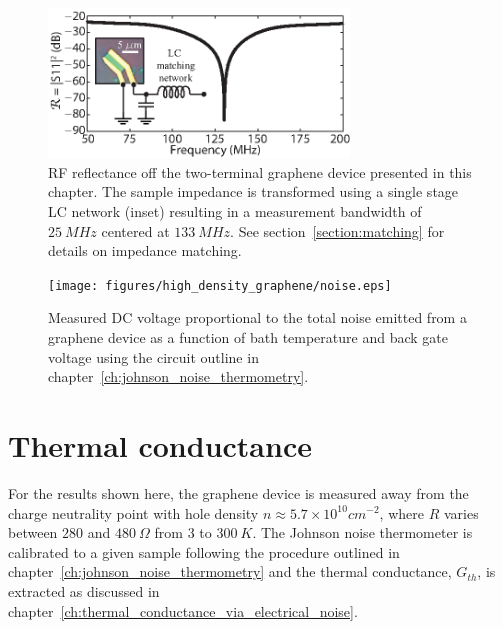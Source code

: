 \begin{figure}
\centering
\includegraphics[width=80mm]{figures/high_density_graphene/matching.eps}
\caption{RF reflectance off the two-terminal graphene device presented in this chapter. The sample impedance is transformed using a single stage LC network (inset) resulting in a measurement bandwidth of $25~MHz$ centered at $133~MHz$. See section~\ref{section:matching} for details on impedance matching.}
\label{fig:Aria_matching}
\end{figure}

\begin{figure}
\centering
\texttt{[image: figures/high\_density\_graphene/noise.eps]}
\caption{Measured DC voltage proportional to the total noise emitted from a graphene device as a function of bath temperature and back gate voltage using the circuit outline in chapter~\ref{ch:johnson_noise_thermometry}.}
\label{fig:Aria_noise}
\end{figure}

\section{Thermal conductance}
For the results shown here, the graphene device is measured away from the charge neutrality point with hole density $n\approx5.7\times 10^{10}cm^{-2}$, where $R$ varies between $280$ and $480~\Omega$ from $3$ to $300~K$. The Johnson noise thermometer is calibrated to a given sample following the procedure outlined in chapter~\ref{ch:johnson_noise_thermometry} and the thermal conductance, $G_{th}$, is extracted as discussed in chapter~\ref{ch:thermal_conductance_via_electrical_noise}.

